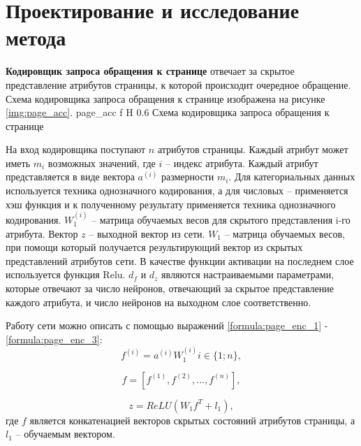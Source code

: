 \chapter{Проектирование и исследование метода}

\textbf{Кодировщик запроса обращения к странице} отвечает за скрытое представление атрибутов страницы, к которой происходит очередное обращение.
Схема кодировщика запроса обращения к странице изображена на рисунке \ref{img:page_acc}.
{page_acc} %
{f} %
{H} %
{0.6\textwidth} %
{Схема кодировщика запроса обращения к странице} %

На вход кодировщика поступают $n$ атрибутов страницы.
Каждый атрибут может иметь $m_i$ возможных значений, где $i$ -- индекс атрибута.
Каждый атрибут представляется в виде вектора $a^{(i)}$ размерности $m_i$.
Для категориальных данных используется техника однозначного кодирования, а для числовых -- применяется хэш функция и к полученному результату применяется техника однозначного кодирования.
$W_1^{(i)}$ -- матрица обучаемых весов для скрытого представления i-го атрибута.
Вектор $z$ -- выходной вектор из сети.
$W_1$ -- матрица обучаемых весов, при помощи который получается результирующий вектор из скрытых представлений атрибутов сети.
В качестве функции активации на последнем слое используется функция Relu.
$d_f$ и $d_z$ являются настраиваемыми параметрами, которые отвечают за число нейронов, отвечающий за скрытое представление каждого атрибута, и число нейронов на выходном слое соответственно.

Работу сети можно описать с помощью выражений
\ref{formula:page_enc_1} - \ref{formula:page_enc_3}:
\begin{equation}\label{formula:page_enc_1}
	f^{(i)} = a^{(i)}W_1^{(i)} i \in \{1;n\},
\end{equation}

\begin{equation}\label{formula:page_enc_2}
	f = [f^{(1)}, f^{(2)}, ..., f^{(n)}],
\end{equation}

\begin{equation}\label{formula:page_enc_3}
	z = ReLU(W_1f^T + l_1),
\end{equation}
где $f$ является конкатенацией векторов скрытых состояний атрибутов страницы, а $l_1$ -- обучаемым вектором.

